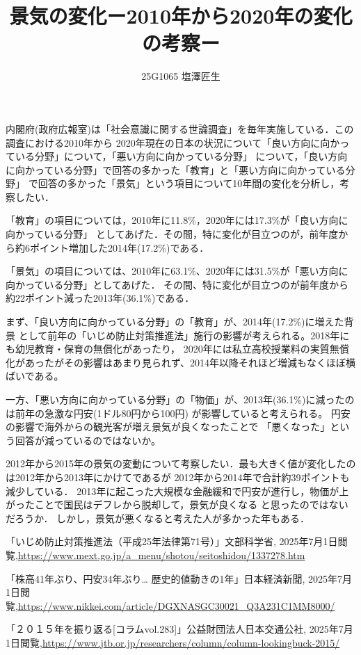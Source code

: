 \documentclass[uplatex,dvipdfmx]{jsarticle}
\begin{document}
\title{景気の変化ー2010年から2020年の変化の考察ー}
\author{25G1065 塩澤匠生}
\maketitle

内閣府(政府広報室)は「社会意識に関する世論調査」を毎年実施している．この調査における2010年から
2020年現在の日本の状況について「良い方向に向かっている分野」について，「悪い方向に向かっている分野」
について，「良い方向に向かっている分野」で回答の多かった「教育」と「悪い方向に向かっている分野」
で回答の多かった「景気」という項目について10年間の変化を分析し，考察したい．

「教育」の項目については，2010年に11.8\%，2020年には17.3\%が「良い方向に向かっている分野」
としてあげた．その間，特に変化が目立つのが，前年度から約6ポイント増加した2014年(17.2\%)である．

「景気」の項目については、2010年に63.1\%、2020年には31.5\%が「悪い方向に向かっている分野」としてあげた．
その間、特に変化が目立つのが前年度から約22ポイント減った2013年(36.1\%)である．

まず、「良い方向に向かっている分野」の「教育」が、2014年(17.2\%)に増えた背景
として前年の「いじめ防止対策推進法」施行の影響が考えられる\cite{ijime}。2018年にも幼児教育・保育の無償化があったり，
2020年には私立高校授業料の実質無償化があったがその影響はあまり見られず、2014年以降それほど増減もなくほぼ横ばいである。

一方、「悪い方向に向かっている分野」の「物価」が、2013年(36.1\%)に減ったのは前年の急激な円安(1ドル80円から100円)
が影響していると考えられる\cite{ennyasu}。
円安の影響で海外からの観光客が増え景気が良くなったことで
「悪くなった」という回答が減っているのではないか。

2012年から2015年の景気の変動について考察したい．最も大きく値が変化したのは2012年から2013年にかけてであるが
2012年から2014年で合計約39ポイントも減少している．
2013年に起こった大規模な金融緩和で円安が進行し，物価が上がったことで国民はデフレから脱却して，景気が良くなる
と思ったのではないだろうか．
しかし，景気が悪くなると考えた人が多かった年もある．

\renewcommand{\refname}{注}
\begin{thebibliography}{11}

 「いじめ防止対策推進法（平成25年法律第71号）」文部科学省, 
2025年7月1日閲覧,\url{https://www.mext.go.jp/a_menu/shotou/seitoshidou/1337278.htm}


 「株高41年ぶり、円安34年ぶり… 歴史的値動きの1年」日本経済新聞, 
2025年7月1日閲覧,\url{https://www.nikkei.com/article/DGXNASGC30021_Q3A231C1MM8000/}


 「２０１５年を振り返る[コラムvol.283]」公益財団法人日本交通公社, 
2025年7月1日閲覧,\url{https://www.jtb.or.jp/researchers/column/column-lookingbuck-2015/}


\end{thebibliography}
\end{document}
